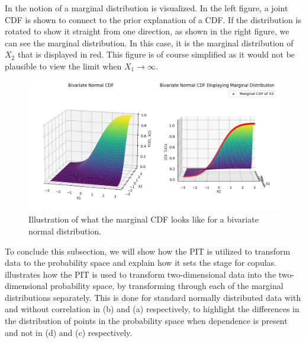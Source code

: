 In  the notion of a marginal distribution is visualized. In the left figure, a joint \gls{CDF} is shown to connect to the prior explanation of a \gls{CDF}. If the distribution is rotated to show it straight from one direction, as shown in the right figure, we can see the marginal distribution. In this case, it is the marginal distribution of $X_2$ that is displayed in red. This figure is of course simplified as it would not be plausible to view the limit when $X_1 \to \infty$.

\begin{figure}
    \centering
    \includegraphics[width=1\linewidth]{3Theory/pictures/MarginalIllustrated.png}
    \caption{Illustration of what the marginal \gls{CDF} looks like for a bivariate normal distribution.   }
    \label{fig:MarginalCDF}
\end{figure}


To conclude this subsection, we will show how the \gls{PIT} is utilized to transform data to the probability space and explain how it sets the stage for copulas.  illustrates how the \gls{PIT} is used to transform two-dimensional data into the two-dimensional probability space, by transforming through each of the marginal distributions separately. This is done for standard normally distributed data with and without correlation in (b) and (a) respectively, to highlight the differences in the distribution of points in the probability space when dependence is present and not in (d) and (c) respectively.

